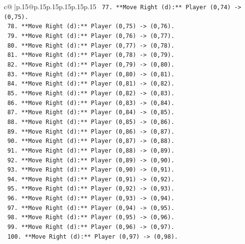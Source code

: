 \documentclass{article}
\begin{document}
{\begin{supertabular}{c@{$\;$}|p{.15\linewidth}@{}p{.15\linewidth}p{.15\linewidth}p{.15\linewidth}p{.15\linewidth}p{.15\linewidth}}
{{{\texttt{        77. **Move Right (d):** Player (0,74) {-}> (0,75).} \\
\texttt{        78. **Move Right (d):** Player (0,75) {-}> (0,76).} \\
\texttt{        79. **Move Right (d):** Player (0,76) {-}> (0,77).} \\
\texttt{        80. **Move Right (d):** Player (0,77) {-}> (0,78).} \\
\texttt{        81. **Move Right (d):** Player (0,78) {-}> (0,79).} \\
\texttt{        82. **Move Right (d):** Player (0,79) {-}> (0,80).} \\
\texttt{        83. **Move Right (d):** Player (0,80) {-}> (0,81).} \\
\texttt{        84. **Move Right (d):** Player (0,81) {-}> (0,82).} \\
\texttt{        85. **Move Right (d):** Player (0,82) {-}> (0,83).} \\
\texttt{        86. **Move Right (d):** Player (0,83) {-}> (0,84).} \\
\texttt{        87. **Move Right (d):** Player (0,84) {-}> (0,85).} \\
\texttt{        88. **Move Right (d):** Player (0,85) {-}> (0,86).} \\
\texttt{        89. **Move Right (d):** Player (0,86) {-}> (0,87).} \\
\texttt{        90. **Move Right (d):** Player (0,87) {-}> (0,88).} \\
\texttt{        91. **Move Right (d):** Player (0,88) {-}> (0,89).} \\
\texttt{        92. **Move Right (d):** Player (0,89) {-}> (0,90).} \\
\texttt{        93. **Move Right (d):** Player (0,90) {-}> (0,91).} \\
\texttt{        94. **Move Right (d):** Player (0,91) {-}> (0,92).} \\
\texttt{        95. **Move Right (d):** Player (0,92) {-}> (0,93).} \\
\texttt{        96. **Move Right (d):** Player (0,93) {-}> (0,94).} \\
\texttt{        97. **Move Right (d):** Player (0,94) {-}> (0,95).} \\
\texttt{        98. **Move Right (d):** Player (0,95) {-}> (0,96).} \\
\texttt{        99. **Move Right (d):** Player (0,96) {-}> (0,97).} \\
\texttt{        100. **Move Right (d):** Player (0,97) {-}> (0,98).} \\
}}}
\end{supertabular}}
\end{document}
